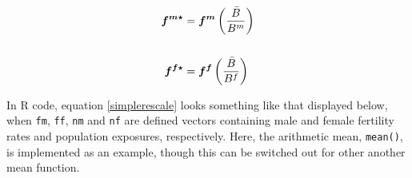 \documentclass[reqno,12pt,oneside,a4paper]{report} %
\theoremstyle{plain}
\theoremstyle{definition}
\theoremstyle{remark}
\numberwithin{theorem}{chapter}     %
\begin{document}
\begin{align}
\bm{f^{m\star }} &= \bm{f^m} \left(\frac{\bar{B}}{B^m}\right) \notag \\ \notag \\
\bm{f^{f\star }} &= \bm{f^f} \left(\frac{\bar{B}}{B^f}\right)
\label{simplerescale}
\end{align}

In R code, equation \ref{simplerescale} looks something like that displayed below, when \texttt{fm}, \texttt{ff}, \texttt{nm} and \texttt{nf} are defined vectors containing male and female fertility rates and population exposures, respectively. Here, the arithmetic mean, \texttt{mean()}, is implemented as an example, though this can be switched out for other another mean function.



\singlespacing
\end{document}
